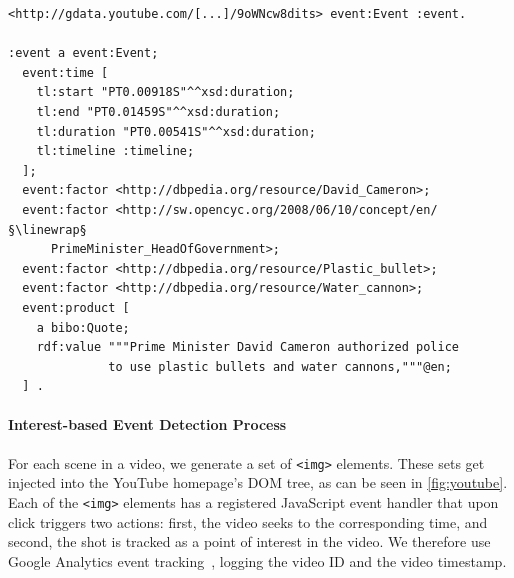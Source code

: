 \documentclass[runningheads,a4paper]{llncs}
\newcommand{\linewrap}{\raisebox{-.6ex}{\textcolor{grey}{$\hookleftarrow$}}}
\begin{document}
\begin{lstlisting}[caption=Exemplary extracted named entities from a YouTube video on the London riots., label=code:semwebvid, float=h, escapechar=§, belowskip=-1em]
<http://gdata.youtube.com/[...]/9oWNcw8dits> event:Event :event.

:event a event:Event;
  event:time [
    tl:start "PT0.00918S"^^xsd:duration;
    tl:end "PT0.01459S"^^xsd:duration;
    tl:duration "PT0.00541S"^^xsd:duration;
    tl:timeline :timeline;
  ];
  event:factor <http://dbpedia.org/resource/David_Cameron>;
  event:factor <http://sw.opencyc.org/2008/06/10/concept/en/§\linewrap§
      PrimeMinister_HeadOfGovernment>;
  event:factor <http://dbpedia.org/resource/Plastic_bullet>;
  event:factor <http://dbpedia.org/resource/Water_cannon>;
  event:product [
    a bibo:Quote;
    rdf:value """Prime Minister David Cameron authorized police
              to use plastic bullets and water cannons,"""@en;
  ] .
\end{lstlisting} 

\paragraph{Interest-based Event Detection Process}
For each scene in a video, we generate a set of \texttt{<img>} elements. These sets get injected into the YouTube homepage's DOM tree, as can be seen in \autoref{fig:youtube}. Each of the \texttt{<img>} elements has a registered JavaScript event handler that upon click triggers two actions: first, the video seeks to the corresponding time, and second, the shot is tracked as a point of interest in the video. We therefore use Google Analytics event tracking~\cite{analyticsevent}, logging the video ID and the video timestamp.
\end{document}

